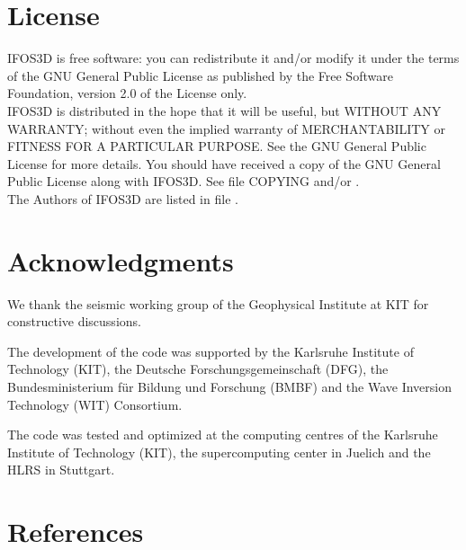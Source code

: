 \documentclass[12pt,twoside,a4paper]{report}
\numberwithin{equation}{chapter}
\numberwithin{figure}{chapter}
\numberwithin{table}{chapter}
\begin{document}
\newpage

\section*{License}\label{license}

IFOS3D is free software: you can redistribute it and/or modify it under the terms of the GNU General Public License as published by the Free Software Foundation, version 2.0 of the License only.\\
 \newline
IFOS3D is distributed in the hope that it will be useful, but WITHOUT ANY WARRANTY; without even the implied warranty of MERCHANTABILITY or FITNESS FOR A PARTICULAR PURPOSE. See the GNU General Public License for more details. You should have received a copy of the GNU General Public License along with IFOS3D. See file COPYING and/or .\\
\newline
The Authors of IFOS3D are listed in file .
\section*{Acknowledgments}

We thank the seismic working group of the Geophysical Institute at KIT for constructive discussions. 

\noindent The development of the code was supported by the Karlsruhe Institute of Technology (KIT), the Deutsche Forschungsgemeinschaft (DFG), the Bundesministerium f\"ur Bildung und Forschung (BMBF) and the Wave Inversion Technology (WIT) Consortium.

\noindent The code was tested and optimized at the computing centres of the Karlsruhe Institute of Technology (KIT), the supercomputing center in Juelich and the HLRS in Stuttgart. 
\newline

\section*{References}
\end{document}
